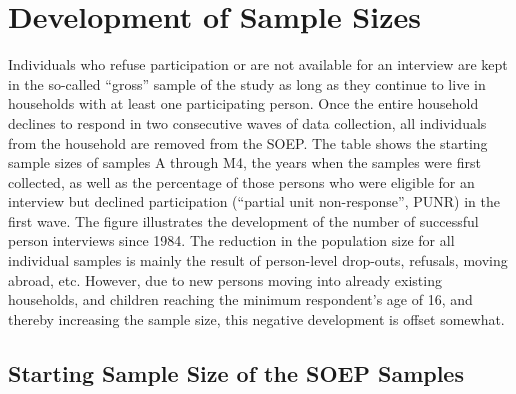 \documentclass[letterpaper,10pt,openany,onesideH,english]{sphinxmanual}
\begin{document}
\section{Development of Sample Sizes}
\label{\detokenize{Target Population and Samples/index:development-of-sample-sizes}}
Individuals who refuse participation or are not available for an interview are kept in the so-called “gross” sample of the study as long as they continue to live in households with at least one participating person. Once the entire household declines to respond in two consecutive waves of data collection, all individuals from the household are removed from the SOEP. The table shows the starting sample sizes of samples A through M4, the years when the samples were first collected, as well as the percentage of those persons who were eligible for an interview but declined participation (“partial unit non-response”, PUNR) in the first wave. The figure illustrates the development of the number of successful person interviews since 1984. The reduction in the population size for all individual samples is mainly the result of person-level drop-outs, refusals, moving abroad, etc. However, due to new persons moving into already existing households, and children reaching the minimum respondent’s age of 16, and thereby increasing the sample size, this negative development is offset somewhat.


\subsection{Starting Sample Size of the SOEP Samples}
\label{\detokenize{Target Population and Samples/index:starting-sample-size-of-the-soep-samples}}
\end{document}
